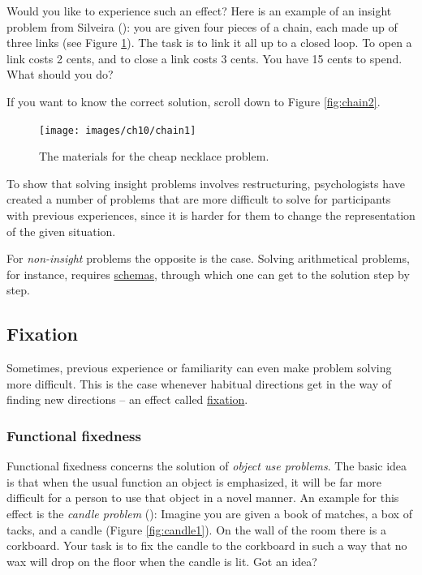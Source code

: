 \documentclass[
]{krantz}
\begin{document}
Would you like to experience such an effect? Here is an example of an insight problem from Silveira (): you are given four pieces of a chain, each made up of three links (see Figure \ref{fig:chain1}). The task is to link it all up to a closed loop. To open a link costs 2 cents, and to close a link costs 3 cents. You have 15 cents to spend. What should you do?

If you want to know the correct solution, scroll down to Figure \ref{fig:chain2}.

\begin{figure}

{\centering \texttt{[image: images/ch10/chain1]} 

}

\caption{The materials for the cheap necklace problem.}\label{fig:chain1}
\end{figure}

To show that solving insight problems involves restructuring, psychologists have created a number of problems that are more difficult to solve for participants with previous experiences, since it is harder for them to change the representation of the given situation.

For \emph{non-insight} problems the opposite is the case. Solving arithmetical problems, for instance, requires \hyperref[schemas]{schemas}, through which one can get to the solution step by step.

\subsection*{Fixation}\label{fixation}


Sometimes, previous experience or familiarity can even make problem solving more difficult. This is the case whenever habitual directions get in the way of finding new directions -- an effect called \hyperref[fixation]{fixation}.

\subsubsection*{Functional fixedness}\label{functional-fixedness}


Functional fixedness concerns the solution of \emph{object use problems}. The basic idea is that when the usual function an object is emphasized, it will be far more difficult for a person to use that object in a novel manner. An example for this effect is the \emph{candle problem} (): Imagine you are given a book of matches, a box of tacks, and a candle (Figure \ref{fig:candle1}). On the wall of the room there is a corkboard. Your task is to fix the candle to the corkboard in such a way that no wax will drop on the floor when the candle is lit. Got an idea?
\end{document}
